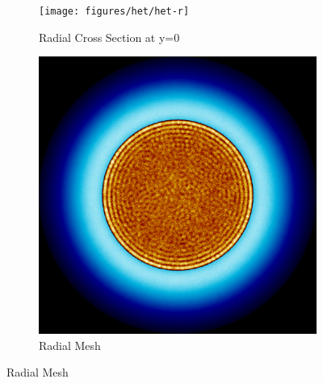 \begin{figure}[H]
\centering

\begin{subfigure}{0.4\textwidth}
  \texttt{[image: figures/het/het-r]}
  \caption{Radial Cross Section at y=0}
  \label{fig:heta}
\end{subfigure}%
%
\begin{subfigure}{0.4\textwidth}
  \includegraphics[width=0.95\linewidth]{figures/het/het-rm}
  \caption{Radial Mesh}
  \label{fig:hetb}
\end{subfigure}


\end{figure}
